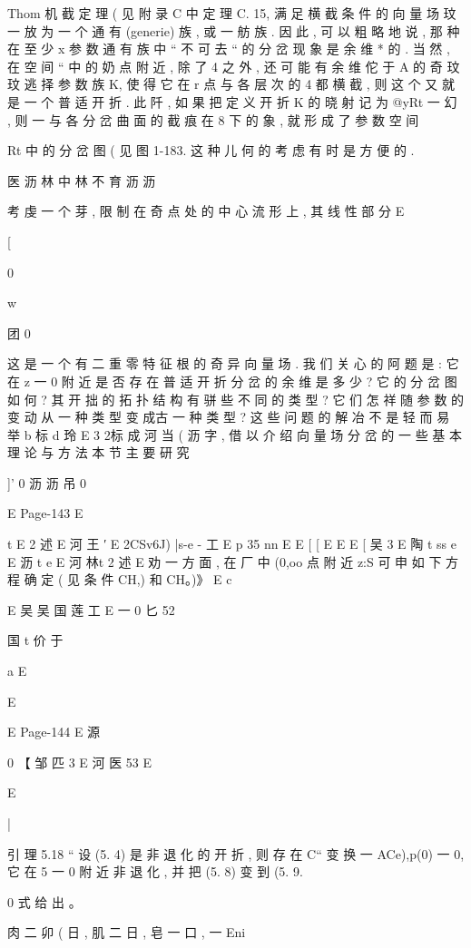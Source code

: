 {{{{{{{{{Thom 机 截 定 理 ( 见 附 录 C 中 定 理 C. 15, 满 足 横 截 条 件 的 向 量 场
玟
一 放 为 一 个 通 有 (generie) 族 , 或 一 舫 族 . 因 此 , 可 以 粗 略 地 说 , 那
种 在 至 少 x 参 数 通 有 族 中 “ 不 可 去 “ 的 分 岔 现 象 是 余 维 * 的 . 当 然 ,
在 空 间 “ 中 的 奶 点 附 近 , 除 了 4 之 外 , 还 可 能 有 余 维 佗 于 A 的 奇
玟
玟
逃 择 参 数 族 K, 使 得 它 在 r 点 与 各 层 次 的 4 都 横 截 , 则 这 个 又
就 是 一 个 普 适 开 折 . 此 阡 , 如 果 把 定 义 开 折 K 的 晓 射 记 为 @yRt 一
幻 , 则 一 与 各 分 岔 曲 面 的 截 痕 在 8 下 的 象 , 就 形 成 了 参 数 空 间

Rt 中 的 分 岔 图 ( 见 图 1-183. 这 种 儿 何 的 考 虑 有 时 是 方 便 的 .

医 沥 林 中 林 不 育 沥 沥

考 虔 一 个 芽 , 限 制 在 奇 点 处 的 中 心 流 形 上 , 其 线 性 部 分
E

[

0

w

团
0

这 是 一 个 有 二 重 零 特 征 根 的 奇 异 向 量 场 . 我 们 关 心 的 阿 题 是 :
它 在 z 一 0 附 近 是 否 存 在 普 适 开 折 分 岔 的 余 维 是 多 少 ? 它 的 分 岔
图 如 何 ? 其 开 拙 的 拓 扑 结 构 有 骈 些 不 同 的 类 型 ? 它 们 怎 祥 随 参 数 的
变 动 从 一 种 类 型 变 成古 一 种 类 型 ? 这 些 问 题 的 解 冶 不 是 轻 而 易 举
b 标 d
玲
E 3 2标 成 河 当 ( 沥
字 , 借 以 介 绍 向 量 场 分 岔 的 一 些 基 本 理 论 与 方 法 本 节 主 要 研 究

]' 0 沥 沥 吊 0

E
Page-143
E

t
E 2 述
E 河 王 ′
E
2CSv6J) |s-e -
工
E p 35 nn
E
E
[ [
E
E
E
[ 吴 3
E
陶 t ss e
E 沥 t e
E 河 林t
2 述
E
劝 一 方 面 , 在 厂 中 (0,oo 点 附 近 z:S 可 申 如 下 方 程 确 定 ( 见
条 件 CH,) 和 CH。)》
E c

E 吴 吴 国 莲 工
E 一 0 匕 52

国 t
价 于

a E

E

E
Page-144
E 源

0 【
邹 匹
3 E
河
医
53 E

E

|

引 理 5.18 “ 设 (5. 4) 是 非 退 化 的 开 折 , 则 存 在 C“ 变 换 一
ACe),p(0) 一 0, 它 在 5 一 0 附 近 非 退 化 , 并 把 (5. 8) 变 到 (5. 9.

0
式 给 出 。

肉 二 卯 ( 日 , 肌 二 日 , 皂 一 口 , 一 Eni

}}}}}}}}}
